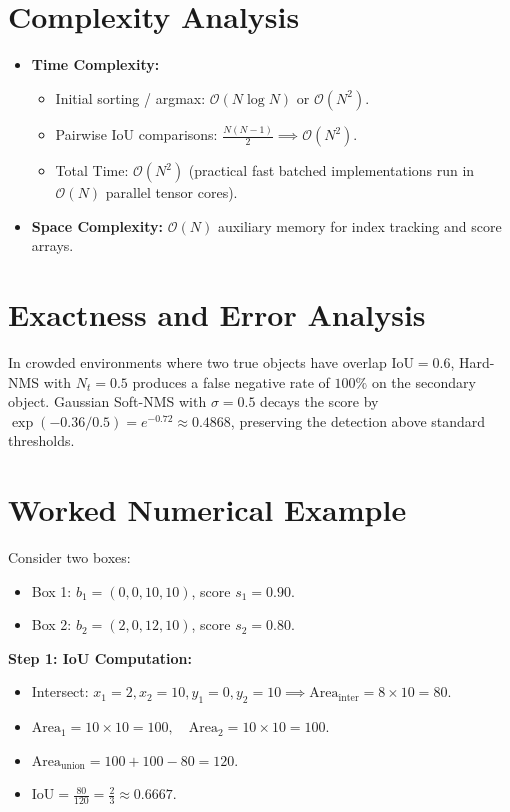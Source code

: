 \documentclass[11pt,a4paper]{article}
\theoremstyle{definition}
\begin{document}
\section{Complexity Analysis}

\begin{itemize}
    \item \textbf{Time Complexity:}
    \begin{itemize}
        \item Initial sorting / argmax: $\mathcal{O}(N \log N)$ or $\mathcal{O}(N^2)$.
        \item Pairwise IoU comparisons: $\frac{N(N-1)}{2} \implies \mathcal{O}(N^2)$.
        \item Total Time: $\mathcal{O}(N^2)$ (practical fast batched implementations run in $\mathcal{O}(N)$ parallel tensor cores).
    \end{itemize}
    \item \textbf{Space Complexity:} $\mathcal{O}(N)$ auxiliary memory for index tracking and score arrays.
\end{itemize}

\section{Exactness and Error Analysis}

In crowded environments where two true objects have overlap $\text{IoU} = 0.6$, Hard-NMS with $N_t = 0.5$ produces a false negative rate of $100\%$ on the secondary object. Gaussian Soft-NMS with $\sigma = 0.5$ decays the score by $\exp(-0.36 / 0.5) = e^{-0.72} \approx 0.4868$, preserving the detection above standard thresholds.

\section{Worked Numerical Example}

Consider two boxes:
\begin{itemize}
    \item Box 1: $b_1 = (0, 0, 10, 10)$, score $s_1 = 0.90$.
    \item Box 2: $b_2 = (2, 0, 12, 10)$, score $s_2 = 0.80$.
\end{itemize}

\textbf{Step 1: IoU Computation:}
\begin{itemize}
    \item Intersect: $x_1 = 2, x_2 = 10, y_1 = 0, y_2 = 10 \implies \text{Area}_{\text{inter}} = 8 \times 10 = 80$.
    \item $\text{Area}_1 = 10 \times 10 = 100, \quad \text{Area}_2 = 10 \times 10 = 100$.
    \item $\text{Area}_{\text{union}} = 100 + 100 - 80 = 120$.
    \item $\text{IoU} = \frac{80}{120} = \frac{2}{3} \approx 0.6667$.
\end{itemize}
\end{document}
